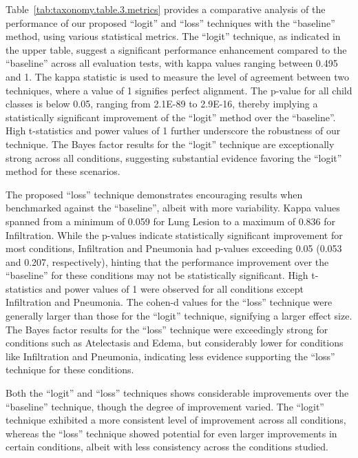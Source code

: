 Table~\ref{tab:taxonomy.table.3.metrics} provides a comparative analysis of the performance of our proposed ``logit'' and ``loss'' techniques with the ``baseline'' method, using various statistical metrics. The ``logit'' technique, as indicated in the upper table, suggest a significant performance enhancement compared to the ``baseline'' across all evaluation tests, with kappa values ranging between 0.495 and 1. The kappa statistic is used to measure the level of agreement between two techniques, where a value of 1 signifies perfect alignment. The p-value for all child classes is below 0.05, ranging from 2.1E-89 to 2.9E-16, thereby implying a statistically significant improvement of the ``logit'' method over the ``baseline''. High t-statistics and power values of 1 further underscore the robustness of our technique. The Bayes factor results for the ``logit'' technique are exceptionally strong across all conditions, suggesting substantial evidence favoring the ``logit'' method for these scenarios.

The proposed ``loss'' technique demonstrates encouraging results when benchmarked against the ``baseline'', albeit with more variability. Kappa values spanned from a minimum of 0.059 for Lung Lesion to a maximum of 0.836 for Infiltration. While the p-values indicate statistically significant improvement for most conditions, Infiltration and Pneumonia had p-values exceeding 0.05 (0.053 and 0.207, respectively), hinting that the performance improvement over the ``baseline'' for these conditions may not be statistically significant. High t-statistics and power values of 1 were observed for all conditions except Infiltration and Pneumonia. The cohen-d values for the ``loss'' technique were generally larger than those for the ``logit'' technique, signifying a larger effect size. The Bayes factor results for the ``loss'' technique were exceedingly strong for conditions such as Atelectasis and Edema, but considerably lower for conditions like Infiltration and Pneumonia, indicating less evidence supporting the ``loss'' technique for these conditions.

Both the ``logit'' and ``loss'' techniques shows considerable improvements over the ``baseline'' technique, though the degree of improvement varied. The ``logit'' technique exhibited a more consistent level of improvement across all conditions, whereas the ``loss'' technique showed potential for even larger improvements in certain conditions, albeit with less consistency across the conditions studied.

